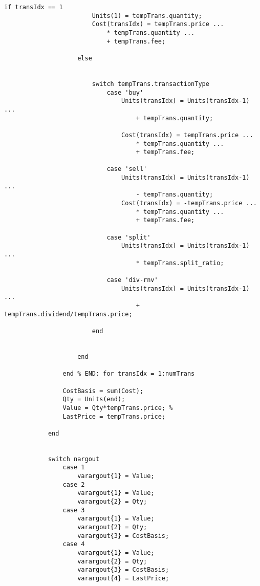 \begin{lstlisting}[style=Matlab-editor, caption={The \texttt{Asset} class with a new \texttt{calculateValue()} method.}, label={lst:AssetValueCalculation}]
                    if transIdx == 1
                        Units(1) = tempTrans.quantity;
                        Cost(transIdx) = tempTrans.price ...
                            * tempTrans.quantity ...
                            + tempTrans.fee;
                        
                    else
                        
                        
                        switch tempTrans.transactionType
                            case 'buy'
                                Units(transIdx) = Units(transIdx-1) ...
                                    + tempTrans.quantity;

                                Cost(transIdx) = tempTrans.price ...
                                    * tempTrans.quantity ...
                                    + tempTrans.fee;
                                
                            case 'sell'
                                Units(transIdx) = Units(transIdx-1) ...
                                    - tempTrans.quantity;
                                Cost(transIdx) = -tempTrans.price ...
                                    * tempTrans.quantity ...
                                    + tempTrans.fee;
                                
                            case 'split'
                                Units(transIdx) = Units(transIdx-1) ...
                                    * tempTrans.split_ratio;
                                
                            case 'div-rnv'
                                Units(transIdx) = Units(transIdx-1) ...
                                    + tempTrans.dividend/tempTrans.price;
                                
                        end
                        
                        
                    end

                end % END: for transIdx = 1:numTrans 
                
                CostBasis = sum(Cost);
                Qty = Units(end);
                Value = Qty*tempTrans.price; %
                LastPrice = tempTrans.price;
                
            end
            
            
            switch nargout
                case 1
                    varargout{1} = Value;
                case 2
                    varargout{1} = Value;
                    varargout{2} = Qty;
                case 3
                    varargout{1} = Value;
                    varargout{2} = Qty;
                    varargout{3} = CostBasis;
                case 4
                    varargout{1} = Value;
                    varargout{2} = Qty;
                    varargout{3} = CostBasis;
                    varargout{4} = LastPrice;


\end{lstlisting}

